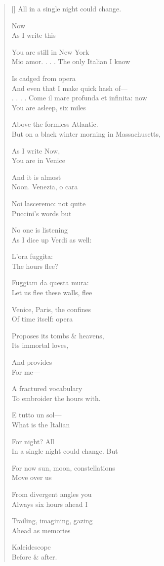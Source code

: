 \label{ch:e_tutto}
\settowidth{\versewidth}{But on a black winter morning in Massachusetts,}
\begin{verse}[\versewidth]
All in a single night could change.

Now\\
As I write this

You are still in New York\\
Mio amor. . . . The only Italian I know

Is cadged from opera\\
And even that I make quick hash of---\\
. . . . Come il mare profunda et infinita: now\\
You are asleep, six miles

Above the formless Atlantic.\\
But on a black winter morning in Massachusetts,

As I write Now,\\
You are in Venice

And it is almost\\
Noon.   Venezia, o cara

Noi lasceremo: not quite\\
Puccini's words but

No one is listening\\
As I dice up Verdi as well:

L'ora fuggita:\\
The hours flee?  

Fuggiam da questa mura:\\
Let us flee these walls, flee

Venice, Paris, the confines\\
Of time itself: opera

Proposes its tombs \& heavens,\\
Its immortal loves,

And provides---\\
For me---

A fractured vocabulary\\
To embroider the hours with.

E tutto un sol---\\
What is the Italian

For night? All\\
In a single night could change. But

For now sun, moon, constellations\\
Move over us

From divergent angles   you\\
Always six hours ahead   I

Trailing, imagining, gazing\\
Ahead as memories

Kaleidescope\\
Before \& after.
\end{verse}

